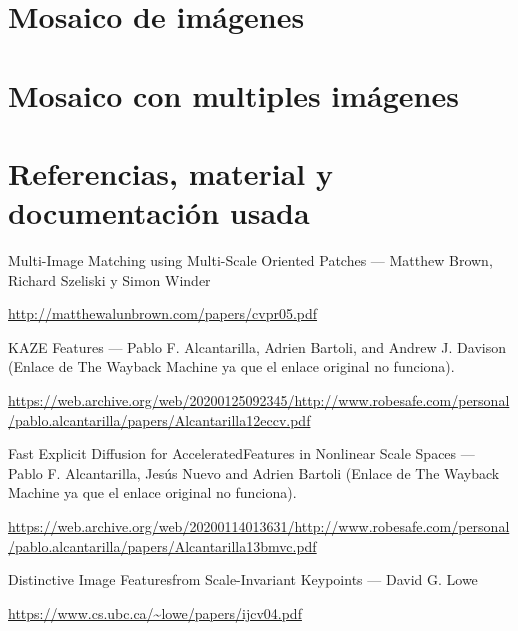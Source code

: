 \documentclass[12pt, spanish]{article}
\begin{document}
\newpage

\section{Mosaico de imágenes}

\section{Mosaico con multiples imágenes}



\newpage

\section{Referencias, material y documentación usada}


\begin{thebibliography}{9}


		Multi-Image Matching using Multi-Scale Oriented Patches --- Matthew Brown, Richard Szeliski y Simon Winder

		\url{http://matthewalunbrown.com/papers/cvpr05.pdf}


		KAZE Features --- Pablo F. Alcantarilla, Adrien Bartoli, and Andrew J. Davison (Enlace de The Wayback Machine ya que el enlace original no funciona).

		\url{https://web.archive.org/web/20200125092345/http://www.robesafe.com/personal/pablo.alcantarilla/papers/Alcantarilla12eccv.pdf}


		Fast Explicit Diffusion for AcceleratedFeatures in Nonlinear Scale Spaces --- Pablo F. Alcantarilla, Jesús Nuevo and Adrien Bartoli (Enlace de The Wayback Machine ya que el enlace original no funciona).

		\url{https://web.archive.org/web/20200114013631/http://www.robesafe.com/personal/pablo.alcantarilla/papers/Alcantarilla13bmvc.pdf}



		Distinctive Image Featuresfrom Scale-Invariant Keypoints --- David G. Lowe

		\url{https://www.cs.ubc.ca/~lowe/papers/ijcv04.pdf}


\end{thebibliography}
\end{document}
